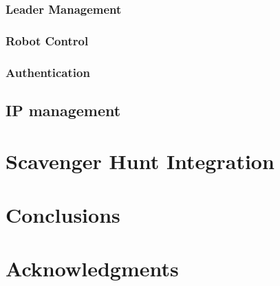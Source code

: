 \documentclass{sig-alternate-05-2015}
\begin{document}
\subsubsection{Leader Management}

\subsubsection{Robot Control}

\subsubsection{Authentication}

\subsection{IP management}

\section{Scavenger Hunt Integration}

\section{Conclusions}

\section{Acknowledgments}


\end{document}
